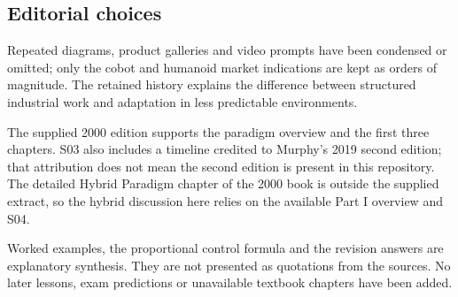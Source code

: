 \subsection{Editorial choices}
Repeated diagrams, product galleries and video prompts have been condensed or omitted; only the cobot and humanoid market indications are kept as orders of magnitude. The retained history explains the difference between structured industrial work and adaptation in less predictable environments.

The supplied 2000 edition supports the paradigm overview and the first three chapters. S03 also includes a timeline credited to Murphy's 2019 second edition; that attribution does not mean the second edition is present in this repository. The detailed Hybrid Paradigm chapter of the 2000 book is outside the supplied extract, so the hybrid discussion here relies on the available Part I overview and S04.

Worked examples, the proportional control formula and the revision answers are explanatory synthesis. They are not presented as quotations from the sources. No later lessons, exam predictions or unavailable textbook chapters have been added.
